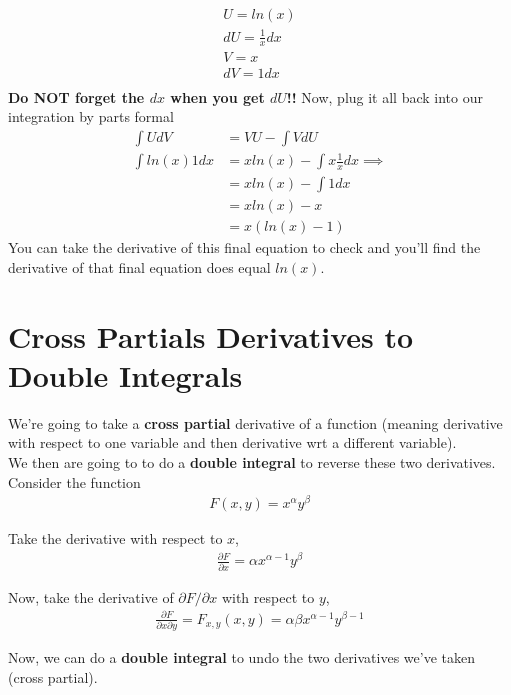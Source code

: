 \documentclass{article}
\begin{document}
\begin{align}
    U = ln(x) \\
    dU = \frac{1}{x} dx\\
    V = x \\
    dV = 1 dx\\
\end{align}
\textbf{Do NOT forget the $dx$ when you get $dU$!!} Now, plug it all back into our integration by parts formal 
\begin{align}
    \int U dV &= V U - \int V dU\\
    \int ln(x) 1 dx &= x ln(x) - \int x \frac{1}{x} dx \implies \\
    &= x ln(x) - \int 1 dx  \\
    & = x ln(x) - x\\
    &= x (ln(x) - 1)
\end{align}
You can take the derivative of this final equation to check and you'll find the derivative of that final equation does equal $ln(x)$.

\section{Cross Partials Derivatives to Double Integrals}

We're going to take a \textbf{cross partial} derivative of a function (meaning derivative with respect to one variable and then derivative wrt a different variable). \\

We then are going to to do a \textbf{double integral} to reverse these two derivatives. \\

Consider the function 
\begin{align}
    F(x,y) = x^\alpha y^\beta \label{org}
\end{align}

Take the derivative with respect to $x$,
\begin{align}
    \frac{\partial F}{\partial x} = \alpha x^{\alpha -1}y ^\beta \label{derv}
\end{align}

Now, take the derivative of $\partial F / \partial x$ with respect to $y$, 
\begin{align}
    \frac{\partial F}{\partial x \partial y} = F_{x,y}(x,y) = \alpha \beta x^{\alpha -1} y^{\beta - 1}
\end{align}

Now, we can do a \textbf{double integral} to undo the two derivatives we've taken (cross partial). 
\end{document}
